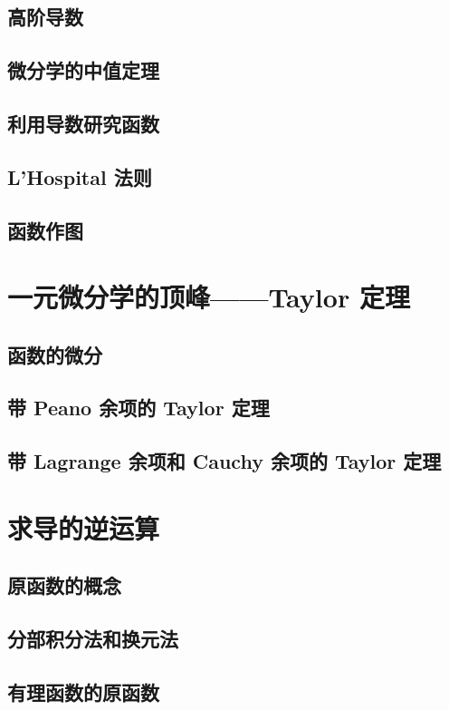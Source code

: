 \documentclass[a4paper, 11pt]{ctexbook}
\begin{document}
        \section{高阶导数}
        \section{微分学的中值定理}
        \section{利用导数研究函数}
        \section{L'Hospital 法则}
        \section{函数作图}
    \chapter{一元微分学的顶峰——Taylor 定理}
        \section{函数的微分}
            
        \section{带 Peano 余项的 Taylor 定理}
            
        \section{带 Lagrange 余项和 Cauchy 余项的 Taylor 定理}
    \chapter{求导的逆运算}
        \section{原函数的概念}
            
        \section{分部积分法和换元法}
        \section{有理函数的原函数}
\end{document}
